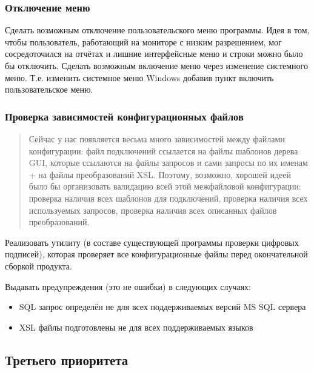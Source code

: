 \subsubsection{Отключение меню}

Сделать возможным отключение пользовательского меню программы. Идея в том, чтобы пользователь,
работающий на мониторе с низким разрешением, мог сосредоточился на отчётах и лишние интерфейсные
меню и строки можно было бы отключить. Сделать возможным включение меню через изменение системного
меню. Т.е. изменить системное меню Windows добавив пункт включить пользовательское меню.

\subsubsection{Проверка зависимостей конфигурационных файлов}

\begin{quote}

	Сейчас у нас появляется весьма много зависимостей между файлами конфигурации: файл подключений
	ссылается на файлы шаблонов дерева GUI, которые ссылаются на файлы запросов и сами запросы по их
	именам + на файлы преобразований XSL. Поэтому, возможно, хорошей идеей было бы организовать
	валидацию всей этой межфайловой конфигурации: проверка наличия всех шаблонов для подключений,
	проверка наличия всех используемых запросов, проверка наличия всех описанных файлов
	преобразований.

\end{quote}

\bigskip

Реализовать утилиту (в составе существующей программы проверки цифровых подписей), которая проверяет
все конфигурационные файлы перед окончательной сборкой продукта.

\bigskip

Выдавать предупреждения (это не ошибки) в следующих случаях:

\begin{itemize}

	\item SQL запрос определён не для всех поддерживаемых версий MS SQL сервера

	\item XSL файлы подготовлены не для всех поддерживаемых языков

\end{itemize}

\subsection{Третьего приоритета}

